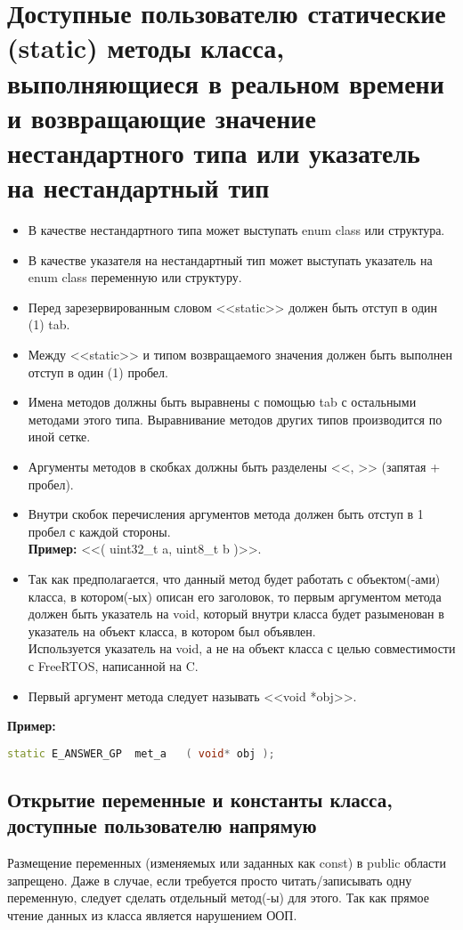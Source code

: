 \section{Доступные пользователю статические (static) методы класса, выполняющиеся в реальном времени и возвращающие значение нестандартного типа или указатель на нестандартный тип}\label{dp:s:n}
\begin{itemize}
	\item В качестве нестандартного типа может выступать enum class или структура.
	\item В качестве указателя на нестандартный тип может выступать указатель на enum class переменную или структуру.
	\item Перед зарезервированным словом <<static>> должен быть отступ в один (1) tab.
	\item Между <<static>> и типом возвращаемого значения должен быть выполнен отступ в один (1) пробел.
	\item Имена методов должны быть выравнены с помощью tab с остальными методами этого типа. Выравнивание методов других типов производится по иной сетке.
	\item Аргументы методов в скобках должны быть разделены <<, >> (запятая + пробел).
	\item Внутри скобок перечисления аргументов метода должен быть отступ в 1 пробел с каждой стороны.\\\textbf{Пример: } <<( uint32\_t a, uint8\_t b )>>.
	\item Так как предполагается, что данный метод будет работать с объектом(-ами) класса, в котором(-ых) описан его заголовок, то первым аргументом метода должен быть указатель на void, который внутри класса будет разыменован в указатель на объект класса, в котором был объявлен.\\Используется указатель на void, а не на объект класса с целью совместимости с FreeRTOS, написанной на C.
	\item Первый аргумент метода следует называть <<void *obj>>.
\end{itemize}
\textbf{Пример:}\begin{lstlisting}[language=C++, frame=tlBR, basicstyle=\fontsize{10}{10}\ttfamily]
	static E_ANSWER_GP	met_a	( void* obj );
\end{lstlisting}

\subsection{Открытие переменные и константы класса, доступные пользователю напрямую}\label{dp:op}
Размещение переменных (изменяемых или заданных как const) в public области запрещено. Даже в случае, если требуется просто читать/записывать одну переменную, следует сделать отдельный метод(-ы) для этого. Так как прямое чтение данных из класса является нарушением ООП.

